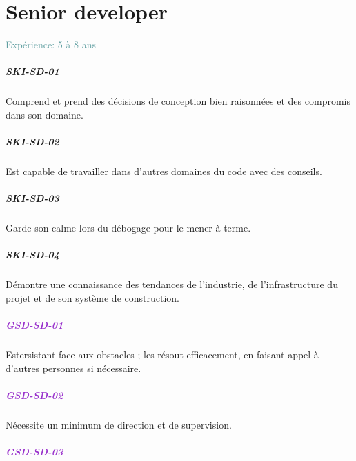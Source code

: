 \documentclass[a4paper, french, openany, 12pt]{book}
\newcommand\dex[1]{\textcolor{BrickRed}{\textbf{\uppercase{ski-{#1}}}}}
\newcommand\str[1]{\textcolor{DarkOrchid}{\textbf{\uppercase{gsd-{#1}}}}}
\newcommand\xp[1]{\textcolor{CadetBlue}{Expérience: {#1} ans}}
\begin{document}
\chapter{Senior developer}

\xp{5 à 8}

\begin{multicols}{2}

  \paragraph*{\dex{sd-01}}

  Comprend et prend des décisions de conception bien raisonnées et des compromis dans son domaine.

  \paragraph*{\dex{sd-02}}

  Est capable de travailler dans d'autres domaines du code avec des conseils.

  \paragraph*{\dex{sd-03}}

  Garde son calme lors du débogage pour le mener à terme.

  \paragraph*{\dex{sd-04}}

  Démontre une connaissance des tendances de l'industrie, de l'infrastructure du projet et de son système de 
  construction.

  \paragraph*{\str{sd-01}}

  Estersistant face aux obstacles ; les résout efficacement, en faisant appel à d'autres personnes si nécessaire. 

  \paragraph*{\str{sd-02}}

  Nécessite un minimum de direction et de supervision.

  \paragraph*{\str{sd-03}}


\end{multicols}
\end{document}

